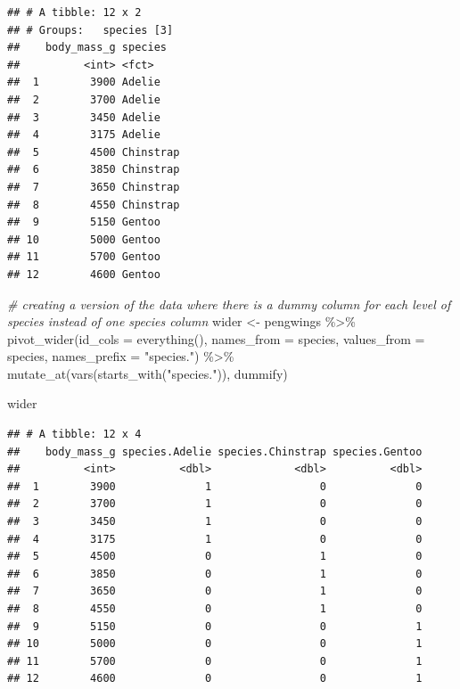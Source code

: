 \documentclass[
  openany]{book}
\newenvironment{Shaded}{\begin{snugshade}}{\end{snugshade}}
\newcommand{\AttributeTok}[1]{\textcolor[rgb]{0.77,0.63,0.00}{#1}}
\newcommand{\CommentTok}[1]{\textcolor[rgb]{0.56,0.35,0.01}{\textit{#1}}}
\newcommand{\FunctionTok}[1]{\textcolor[rgb]{0.00,0.00,0.00}{#1}}
\newcommand{\NormalTok}[1]{#1}
\newcommand{\OtherTok}[1]{\textcolor[rgb]{0.56,0.35,0.01}{#1}}
\newcommand{\SpecialCharTok}[1]{\textcolor[rgb]{0.00,0.00,0.00}{#1}}
\newcommand{\StringTok}[1]{\textcolor[rgb]{0.31,0.60,0.02}{#1}}
\begin{document}
\begin{verbatim}
## # A tibble: 12 x 2
## # Groups:   species [3]
##    body_mass_g species  
##          <int> <fct>    
##  1        3900 Adelie   
##  2        3700 Adelie   
##  3        3450 Adelie   
##  4        3175 Adelie   
##  5        4500 Chinstrap
##  6        3850 Chinstrap
##  7        3650 Chinstrap
##  8        4550 Chinstrap
##  9        5150 Gentoo   
## 10        5000 Gentoo   
## 11        5700 Gentoo   
## 12        4600 Gentoo
\end{verbatim}

\begin{Shaded}
\begin{Highlighting}[]
\CommentTok{\# creating a version of the data where there is a dummy column for each level of species instead of one species column}
\NormalTok{wider }\OtherTok{\textless{}{-}}\NormalTok{ pengwings }\SpecialCharTok{\%\textgreater{}\%} 
  \FunctionTok{pivot\_wider}\NormalTok{(}\AttributeTok{id\_cols =} \FunctionTok{everything}\NormalTok{(), }\AttributeTok{names\_from =}\NormalTok{ species, }\AttributeTok{values\_from =}\NormalTok{ species, }\AttributeTok{names\_prefix =} \StringTok{"species."}\NormalTok{) }\SpecialCharTok{\%\textgreater{}\%} 
  \FunctionTok{mutate\_at}\NormalTok{(}\FunctionTok{vars}\NormalTok{(}\FunctionTok{starts\_with}\NormalTok{(}\StringTok{"species."}\NormalTok{)), dummify)}

\NormalTok{wider}
\end{Highlighting}
\end{Shaded}

\begin{verbatim}
## # A tibble: 12 x 4
##    body_mass_g species.Adelie species.Chinstrap species.Gentoo
##          <int>          <dbl>             <dbl>          <dbl>
##  1        3900              1                 0              0
##  2        3700              1                 0              0
##  3        3450              1                 0              0
##  4        3175              1                 0              0
##  5        4500              0                 1              0
##  6        3850              0                 1              0
##  7        3650              0                 1              0
##  8        4550              0                 1              0
##  9        5150              0                 0              1
## 10        5000              0                 0              1
## 11        5700              0                 0              1
## 12        4600              0                 0              1
\end{verbatim}
\end{document}
